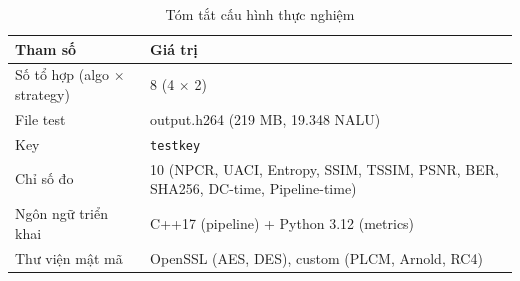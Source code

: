 \begin{table}[ht]
\centering
\caption{Tóm tắt cấu hình thực nghiệm}
\label{tab:exp_summary}
\begin{tabular}{|l|l|}
\hline
\textbf{Tham số} & \textbf{Giá trị} \\
\hline
Số tổ hợp (algo $\times$ strategy) & 8 (4 $\times$ 2) \\
\hline
File test & output.h264 (219 MB, 19.348 NALU) \\
\hline
Key & \texttt{testkey} \\
\hline
Chỉ số đo & 10 (NPCR, UACI, Entropy, SSIM, TSSIM, PSNR, BER, SHA256, DC-time, Pipeline-time) \\
\hline
Ngôn ngữ triển khai & C++17 (pipeline) + Python 3.12 (metrics) \\
\hline
Thư viện mật mã & OpenSSL (AES, DES), custom (PLCM, Arnold, RC4) \\
\hline
\end{tabular}
\end{table}
